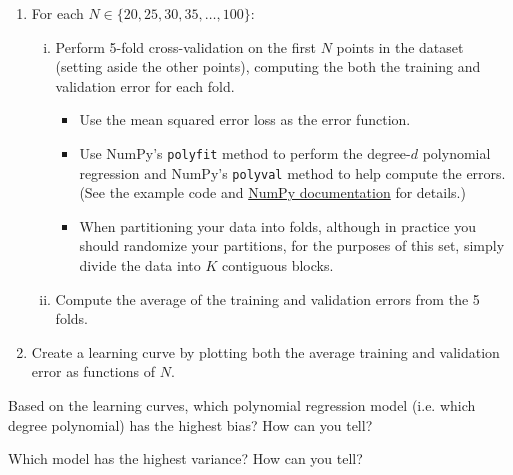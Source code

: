 \begin{problem}[14]
\begin{enumerate}
	\item For each $N \in \{20, 25, 30, 35, \ldots, 100\}$:
	      \begin{enumerate}[i.]
		      \item Perform 5-fold cross-validation on the first $N$ points in the dataset (setting aside the other points), computing the both the training and validation error for each fold.
		            \begin{itemize}
			            \item Use the mean squared error loss as the error function.
			            \item Use NumPy's \texttt{polyfit} method to perform the degree-$d$ polynomial regression and NumPy's \texttt{polyval} method to help compute the errors.
			                  (See the example code and \href{https://docs.scipy.org/doc/NumPy/reference/routines.polynomials.poly1d.html}{NumPy documentation} for details.)
			            \item When partitioning your data into folds, although in practice you should randomize your partitions, for the purposes of this set, simply divide the data into $K$ contiguous blocks.
		            \end{itemize}
		      \item Compute the average of the training and validation errors from the 5 folds.
	      \end{enumerate}
	\item Create a learning curve by plotting both the average training and validation error as functions of $N$.
\end{enumerate}

\end{problem}
\begin{solution}
\end{solution}

\begin{problem}[3]
Based on the learning curves, which polynomial regression model (i.e. which degree polynomial) has the highest bias? How can you tell?
\end{problem}
\begin{solution}

\end{solution}

\begin{problem}[3]
Which model has the highest variance? How can you tell?
\end{problem}
\begin{solution}

\end{solution}

